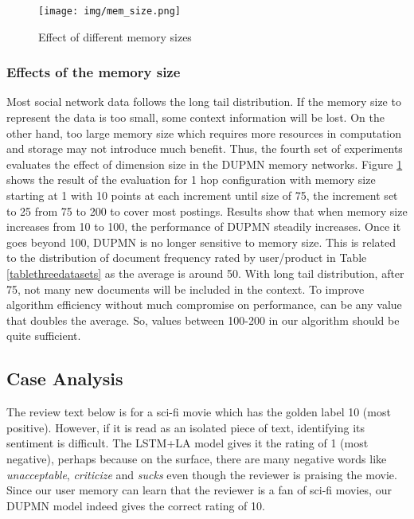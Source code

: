 \documentclass[11pt,a4paper]{article}
\begin{document}
\begin{figure}[!h]
\texttt{[image: img/mem\_size.png]}
\caption{Effect of different memory sizes}
\label{fig:dimensize}
\end{figure}

\subsubsection*{Effects of the memory size}
Most social network data follows the long tail distribution. If the memory size to represent the data is too small, some context information will be lost. On the other hand, too large memory size which requires more resources in computation and storage may not introduce much benefit. Thus, the fourth set of experiments evaluates the effect of dimension size  in the DUPMN memory networks. Figure \ref{fig:dimensize} shows the result of the evaluation for 1 hop configuration with memory size starting at 1 with 10 points at each increment until size of 75, the increment set to 25 from 75 to 200 to cover most postings. Results show that when memory size increases from 10 to 100, the performance of DUPMN steadily increases. Once it goes beyond 100, DUPMN is no longer sensitive to memory size. This is related to the distribution of document frequency rated by user/product in Table \ref{tablethreedatasets} as the average is around 50. With long tail distribution, after 75, not many new documents will be included in the context. To improve algorithm efficiency without much compromise on performance,  can be any value that doubles the average. So, values between 100-200 in our algorithm should be quite sufficient.













\subsection{Case Analysis}
The review text below is for a sci-fi movie which has the golden label 10 (most positive). However, if it is read as an isolated piece of text, identifying its sentiment is difficult. The LSTM+LA model gives it the rating of 1 (most negative), perhaps because on the surface, there are many negative words like \textit{unacceptable}, \textit{criticize} and \textit{sucks} even though the reviewer is praising the movie.  Since our user memory can learn that the reviewer is a fan of sci-fi movies, our DUPMN model indeed gives the correct rating of 10.
\end{document}
